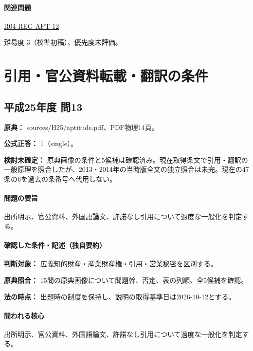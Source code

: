 \paragraph{関連問題} \hyperref[q:r04-reg-apt-12]{R04-REG-APT-12}

\par 難易度 3（校準初稿）、優先度未評価。

\section{引用・官公資料転載・翻訳の条件}

\subsection{平成25年度 問13}
\label{q:h25-reg-apt-13}

\noindent\textbf{原典：} sources/H25/aptitude.pdf、PDF物理14頁。

\textbf{公式正答：} 1（single）。

\par\textbf{検討未確定：} 原典画像の条件と5候補は確認済み。現在取得条文で引用・翻訳の一般原理を照合したが、2013・2014年の当時版全文の独立照合は未完。現在の47条の6を過去の条番号へ代用しない。

\paragraph{問題の要旨} 出所明示、官公資料、外国語論文、許諾なし引用について過度な一般化を判定する。

\paragraph{確認した条件・記述（独自要約）}\mbox{}\par

\noindent\textbf{判断対象：} 広義知的財産・産業財産権・引用・営業秘密を区別する。\par

\noindent\textbf{原典照合：} 15問の原典画像について問題幹、否定、表の列順、全5候補を確認。\par

\noindent\textbf{法の時点：} 出題時の制度を保持し、説明の取得基準日は2026-10-12とする。\par

\paragraph{問われる核心} 出所明示、官公資料、外国語論文、許諾なし引用について過度な一般化を判定する。

